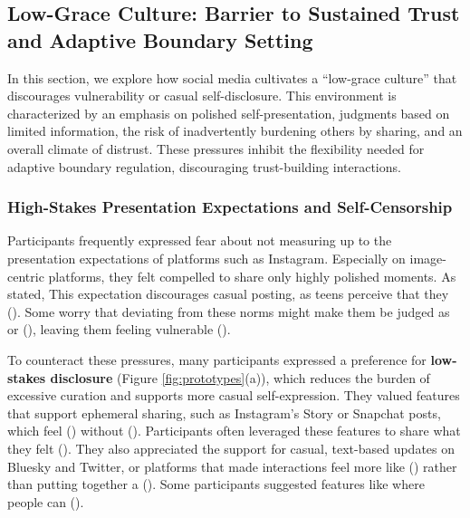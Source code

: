 \subsection{Low-Grace Culture: Barrier to Sustained Trust and Adaptive Boundary Setting}
\label{section:4-3}
In this section, we explore how social media cultivates a ``low-grace culture'' that discourages vulnerability or casual self-disclosure. This environment is characterized by an emphasis on polished self-presentation, judgments based on limited information, the risk of inadvertently burdening others by sharing, and an overall climate of distrust. These pressures inhibit the flexibility needed for adaptive boundary regulation, discouraging trust-building interactions.

\subsubsection{High-Stakes Presentation Expectations and Self-Censorship}
\label{section:4-3-1}
Participants frequently expressed fear about not measuring up to the presentation expectations of platforms such as Instagram. Especially on image-centric platforms, they felt compelled to share only highly polished moments. As  stated,  This expectation discourages casual posting, as teens perceive that they  (). Some worry that deviating from these norms might make them be judged as  or  (), leaving them feeling vulnerable ().

To counteract these pressures, many participants expressed a preference for \textbf{low-stakes disclosure} (Figure \ref{fig:prototypes}(a)), which reduces the burden of excessive curation and supports more casual self-expression. They valued features that support ephemeral sharing, such as Instagram's Story or Snapchat posts, which feel  () without  (). Participants often leveraged these features to share what they felt  (). They also appreciated the support for casual, text-based updates on Bluesky and Twitter, or platforms that made interactions feel more like  () rather than putting together a  (). Some participants suggested features like  where people can  ().

